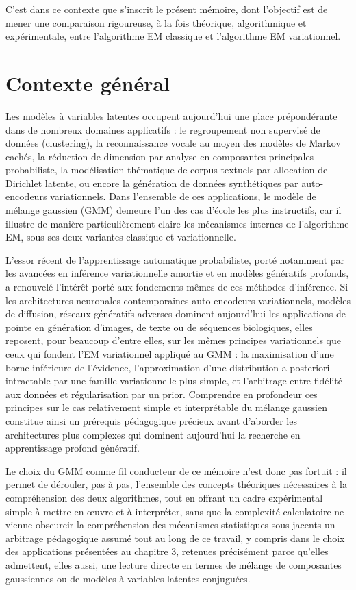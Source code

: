 C'est dans ce contexte que s'inscrit le présent mémoire, dont l'objectif est de mener une comparaison rigoureuse, à la fois théorique, algorithmique et expérimentale, entre l'algorithme EM classique et l'algorithme EM variationnel.

\section*{Contexte général}
Les modèles à variables latentes occupent aujourd'hui une place prépondérante dans de nombreux domaines applicatifs : le regroupement non supervisé de données (clustering), la reconnaissance vocale au moyen des modèles de Markov cachés, la réduction de dimension par analyse en composantes principales probabiliste, la modélisation thématique de corpus textuels par allocation de Dirichlet latente, ou encore la génération de données synthétiques par auto-encodeurs variationnels. Dans l'ensemble de ces applications, le modèle de mélange gaussien (GMM) demeure l'un des cas d'école les plus instructifs, car il illustre de manière particulièrement claire les mécanismes internes de l'algorithme EM, sous ses deux variantes classique et variationnelle.

L'essor récent de l'apprentissage automatique probabiliste, porté notamment par les avancées en inférence variationnelle amortie et en modèles génératifs profonds, a renouvelé l'intérêt porté aux fondements mêmes de ces méthodes d'inférence. Si les architectures neuronales contemporaines  auto-encodeurs variationnels, modèles de diffusion, réseaux génératifs adverses  dominent aujourd'hui les applications de pointe en génération d'images, de texte ou de séquences biologiques, elles reposent, pour beaucoup d'entre elles, sur les mêmes principes variationnels que ceux qui fondent l'EM variationnel appliqué au GMM : la maximisation d'une borne inférieure de l'évidence, l'approximation d'une distribution a posteriori intractable par une famille variationnelle plus simple, et l'arbitrage entre fidélité aux données et régularisation par un prior. Comprendre en profondeur ces principes sur le cas relativement simple et interprétable du mélange gaussien constitue ainsi un prérequis pédagogique précieux avant d'aborder les architectures plus complexes qui dominent aujourd'hui la recherche en apprentissage profond génératif.

Le choix du GMM comme fil conducteur de ce mémoire n'est donc pas fortuit : il permet de dérouler, pas à pas, l'ensemble des concepts théoriques nécessaires à la compréhension des deux algorithmes, tout en offrant un cadre expérimental simple à mettre en œuvre et à interpréter, sans que la complexité calculatoire ne vienne obscurcir la compréhension des mécanismes statistiques sous-jacents  un arbitrage pédagogique assumé tout au long de ce travail, y compris dans le choix des applications présentées au chapitre 3, retenues précisément parce qu'elles admettent, elles aussi, une lecture directe en termes de mélange de composantes gaussiennes ou de modèles à variables latentes conjuguées.

